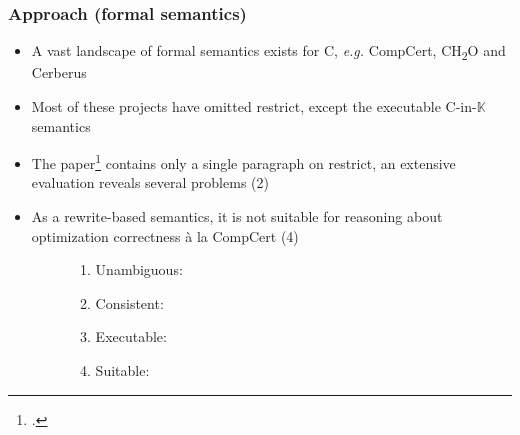 \documentclass[aspectratio=169, c]{beamer}
\makeatletter
\def\eg{\textit{e.g.}\@\xspace}
\def\cink{C-in-$\mathbb{K}\ $}
\newcommand{\cmark}{\ding{51}}%
\newcommand{\xmark}{\ding{55}}%
\makeatother
\begin{document}
\begin{frame}
\frametitle{Approach (formal semantics)}

\begin{itemize}
    \item A vast landscape of formal semantics exists for C, \eg CompCert, CH\textsubscript{2}O and Cerberus
    \item Most of these projects have omitted restrict, except the executable \cink semantics
\end{itemize}

\pause
\begin{itemize}
    \item The paper\footcite{hathhorn2015defining} contains only a single paragraph on restrict, an extensive evaluation reveals several problems (2)
    \item As a rewrite-based semantics, it is not suitable for reasoning about optimization correctness à la CompCert (4)
    \begin{figure}
        \centering
    
    \begin{enumerate}
        \item \textcolor{ao}{Unambiguous: \cmark}
        \item \textcolor{red!80}{Consistent: \xmark}
        \item \textcolor{ao}{Executable: \cmark}
        \item \textcolor{orange!80}{Suitable: \raisebox{-0.5ex}{\scalebox{1.3}{!}}}
    \end{enumerate}
\end{figure}
\end{itemize}


\end{frame}
\end{document}
